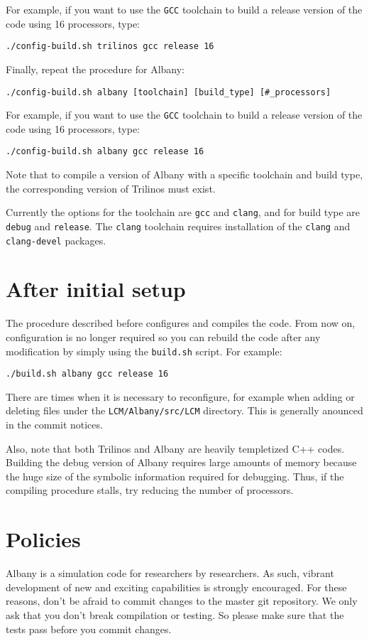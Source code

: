 \documentclass[10pt,a4paper]{article} \usepackage[utf8]{inputenc}
\begin{document}
For example, if you want to use the \verb+GCC+ toolchain to build a
release version of the code using 16 processors, type:
\begin{verbatim}
./config-build.sh trilinos gcc release 16
\end{verbatim}

Finally, repeat the procedure for Albany:
\begin{verbatim}
./config-build.sh albany [toolchain] [build_type] [#_processors]
\end{verbatim}

For example, if you want to use the \verb+GCC+ toolchain to build a
release version of the code using 16 processors, type:
\begin{verbatim}
./config-build.sh albany gcc release 16
\end{verbatim}

Note that to compile a version of Albany with a specific toolchain and
build type, the corresponding version of Trilinos must exist.

Currently the options for the toolchain are \verb+gcc+ and
\verb+clang+, and for build type are \verb+debug+ and
\verb+release+. The \verb+clang+ toolchain requires installation of
the \verb+clang+ and \verb+clang-devel+ packages.

\section{After initial setup}
The procedure described before configures and compiles the code. From
now on, configuration is no longer required so you can rebuild the
code after any modification by simply using the \verb+build.sh+
script. For example:
\begin{verbatim}
./build.sh albany gcc release 16
\end{verbatim}

There are times when it is necessary to reconfigure, for example when
adding or deleting files under the \verb+LCM/Albany/src/LCM+
directory. This is generally anounced in the commit notices.

Also, note that both Trilinos and Albany are heavily templetized C++
codes. Building the debug version of Albany requires large amounts of
memory because the huge size of the symbolic information required for
debugging. Thus, if the compiling procedure stalls, try reducing the
number of processors.

\section{Policies}
Albany is a simulation code for researchers by researchers. As such,
vibrant development of new and exciting capabilities is strongly
encouraged. For these reasons, don't be afraid to commit changes to
the master git repository. We only ask that you don't break
compilation or testing. So please make sure that the tests pass before
you commit changes.
\end{document}
